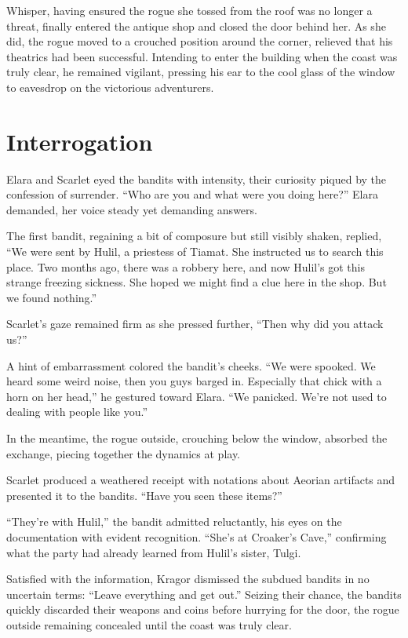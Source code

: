 \documentclass[
  12pt,twoside,twocolumn,openany,nodeprecatedcode]{dndbook}
\begin{document}
Whisper, having ensured the rogue she tossed from the roof was no longer
a threat, finally entered the antique shop and closed the door behind
her. As she did, the rogue moved to a crouched position around the
corner, relieved that his theatrics had been successful. Intending to
enter the building when the coast was truly clear, he remained vigilant,
pressing his ear to the cool glass of the window to eavesdrop on the
victorious adventurers.

\section{Interrogation}\label{interrogation}

Elara and Scarlet eyed the bandits with intensity, their curiosity
piqued by the confession of surrender. ``Who are you and what were you
doing here?'' Elara demanded, her voice steady yet demanding answers.

The first bandit, regaining a bit of composure but still visibly shaken,
replied, ``We were sent by Hulil, a priestess of Tiamat. She instructed
us to search this place. Two months ago, there was a robbery here, and
now Hulil's got this strange freezing sickness. She hoped we might find
a clue here in the shop. But we found nothing.''

Scarlet's gaze remained firm as she pressed further, ``Then why did you
attack us?''

A hint of embarrassment colored the bandit's cheeks. ``We were spooked.
We heard some weird noise, then you guys barged in. Especially that
chick with a horn on her head,'' he gestured toward Elara. ``We
panicked. We're not used to dealing with people like you.''

In the meantime, the rogue outside, crouching below the window, absorbed
the exchange, piecing together the dynamics at play.

Scarlet produced a weathered receipt with notations about Aeorian
artifacts and presented it to the bandits. ``Have you seen these
items?''

``They're with Hulil,'' the bandit admitted reluctantly, his eyes on the
documentation with evident recognition. ``She's at Croaker's Cave,''
confirming what the party had already learned from Hulil's sister,
Tulgi.

Satisfied with the information, Kragor dismissed the subdued bandits in
no uncertain terms: ``Leave everything and get out.'' Seizing their
chance, the bandits quickly discarded their weapons and coins before
hurrying for the door, the rogue outside remaining concealed until the
coast was truly clear.
\end{document}
